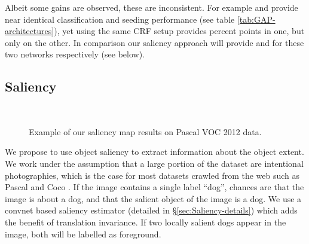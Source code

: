 \documentclass[british,10pt,twocolumn,letterpaper]{article}
\newcommand{\lyxdot}{.}
\begin{document}
Albeit some gains are observed, these are inconsistent. For example
 and 
provide near identical classification and seeding performance (see
table \ref{tab:GAP-architectures}), yet using the same CRF setup
provides  percent points in one, but only 
on the other. In comparison our saliency approach will provide 
and  for these two networks respectively (see below).


\subsection{\label{subsec:Saliency}Saliency}


\begin{figure*}
\begin{centering}
~~\vspace{-1em}
\par\end{centering}
\caption{\label{fig:saliency-examples}Example of our saliency map results
on Pascal VOC 2012 data.}
\end{figure*}


\noindent
We propose to use object saliency to extract information about the
object extent. We work under the assumption that a large portion of
the dataset are intentional photographies, which is the case for most
datasets crawled from the web such as Pascal \cite{pascal-voc-2012}
and Coco \cite{Lin2014EccvCoco}. If the image contains a single label
``dog'', chances are that the image is about a dog, and that the
salient object of the image is a dog. We use a convnet based saliency
estimator (detailed in \S \ref{sec:Saliency-details}) which
adds the benefit of translation invariance. If two locally salient
dogs appear in the image, both will be labelled as foreground.
\end{document}
